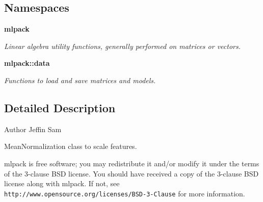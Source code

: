 \subsection*{Namespaces}
\begin{DoxyCompactItemize}
\item 
 \textbf{ mlpack}
\begin{DoxyCompactList}\small\item\em Linear algebra utility functions, generally performed on matrices or vectors. \end{DoxyCompactList}\item 
 \textbf{ mlpack\+::data}
\begin{DoxyCompactList}\small\item\em Functions to load and save matrices and models. \end{DoxyCompactList}\end{DoxyCompactItemize}


\subsection{Detailed Description}
\begin{DoxyAuthor}{Author}
Jeffin Sam
\end{DoxyAuthor}
Mean\+Normalization class to scale features.

mlpack is free software; you may redistribute it and/or modify it under the terms of the 3-\/clause B\+SD license. You should have received a copy of the 3-\/clause B\+SD license along with mlpack. If not, see {\tt http\+://www.\+opensource.\+org/licenses/\+B\+S\+D-\/3-\/\+Clause} for more information. 